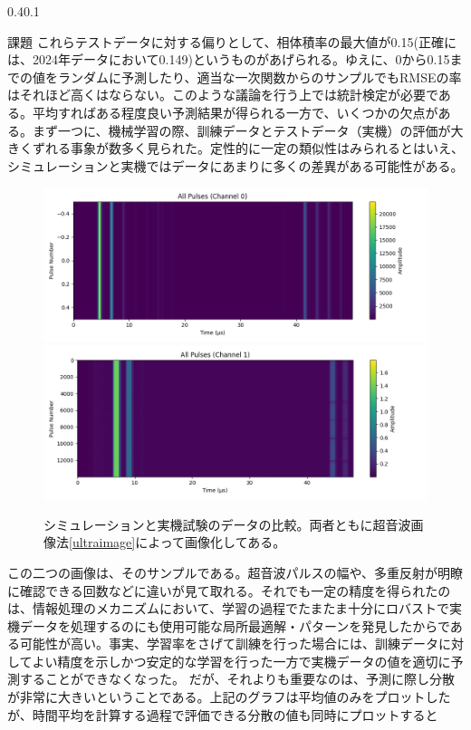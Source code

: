 \documentclass[uplatex]{suribt}
\makeatletter
\renewcommand{\subsection}{%
    \@startsection{subsection}{1}{\z@}%
    {0.4\Cvs}{0.1\Cvs}%
    {\normalfont\normalsize\headfont\raggedright}}
\makeatother
\begin{document}
\subsection{課題}
これらテストデータに対する偏りとして、相体積率の最大値が0.15(正確には、2024年データにおいて0.149)というものがあげられる。ゆえに、0から0.15までの値をランダムに予測したり、適当な一次関数からのサンプルでもRMSEの率はそれほど高くはならない。このような議論を行う上では統計検定が必要である。平均すればある程度良い予測結果が得られる一方で、いくつかの欠点がある。まず一つに、機械学習の際、訓練データとテストデータ（実機）の評価が大きくずれる事象が数多く見られた。定性的に一定の類似性はみられるとはいえ、シミュレーションと実機ではデータにあまりに多くの差異がある可能性がある。\par
\begin{figure}[htbp]
    \centering
    \includegraphics[width=0.5\linewidth]{pictures/explanation/solid_liquid7_processed_0img.png}
    \includegraphics[width=0.5\linewidth]{pictures/explanation/P20240726-1600_processed_1img.png}
    \caption{シミュレーションと実機試験のデータの比較。両者ともに超音波画像法\ref{ultraimage}によって画像化してある。}
    \label{fig:noerrorbar}
\end{figure}
この二つの画像は、そのサンプルである。超音波パルスの幅や、多重反射が明瞭に確認できる回数などに違いが見て取れる。それでも一定の精度を得られたのは、情報処理のメカニズムにおいて、学習の過程でたまたま十分にロバストで実機データを処理するのにも使用可能な局所最適解・パターンを発見したからである可能性が高い。事実、学習率をさげて訓練を行った場合には、訓練データに対してよい精度を示しかつ安定的な学習を行った一方で実機データの値を適切に予測することができなくなった。
だが、それよりも重要なのは、予測に際し分散が非常に大きいということである。上記のグラフは平均値のみをプロットしたが、時間平均を計算する過程で評価できる分散の値も同時にプロットすると
\end{document}
